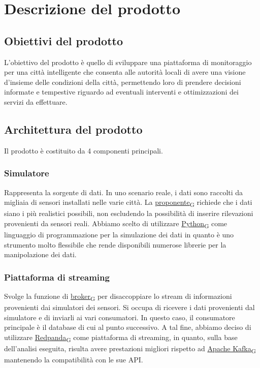 \section{Descrizione del prodotto}
\subsection{Obiettivi del prodotto}
L'obiettivo del prodotto è quello di sviluppare una piattaforma di monitoraggio per una città intelligente che consenta alle autorità locali di avere una visione d'insieme delle condizioni della città, permettendo loro di prendere decisioni informate e tempestive riguardo ad eventuali interventi e ottimizzazioni dei servizi da effettuare.

\subsection{Architettura del prodotto}
Il prodotto è costituito da 4 componenti principali.
	\subsubsection*{Simulatore} 
	Rappresenta la sorgente di dati. In uno scenario reale, i dati sono raccolti da migliaia di sensori installati nelle varie città. La \href{https://7last.github.io/docs/rtb/documentazione-interna/glossario\#proponente}{proponente\textsubscript{G}} richiede che i dati siano i più realistici possibili, non escludendo la possibilità di inserire rilevazioni provenienti da sensori reali. Abbiamo scelto di utilizzare \href{https://7last.github.io/docs/rtb/documentazione-interna/glossario\#python}{Python\textsubscript{G}} come linguaggio di programmazione per la simulazione dei dati in quanto è uno strumento molto flessibile che rende disponibili numerose librerie per la manipolazione dei dati.
	\subsubsection*{Piattaforma di streaming}
	Svolge la funzione di \href{https://7last.github.io/docs/rtb/documentazione-interna/glossario\#broker}{broker\textsubscript{G}} per disaccoppiare lo stream di informazioni provenienti dai simulatori dei sensori. Si occupa di ricevere i dati provenienti dal simulatore e di inviarli ai vari consumatori. In questo caso, il consumatore principale è il database di cui al punto successivo. A tal fine, abbiamo deciso di utilizzare \href{https://7last.github.io/docs/rtb/documentazione-interna/glossario\#Redpanda}{Redpanda\textsubscript{G}} come piattaforma di streaming, in quanto, sulla base dell'analisi eseguita, risulta avere prestazioni migliori rispetto ad \href{https://7last.github.io/docs/rtb/documentazione-interna/glossario\#apache-kafka}{Apache Kafka\textsubscript{G}} mantenendo la compatibilità con le sue API.
